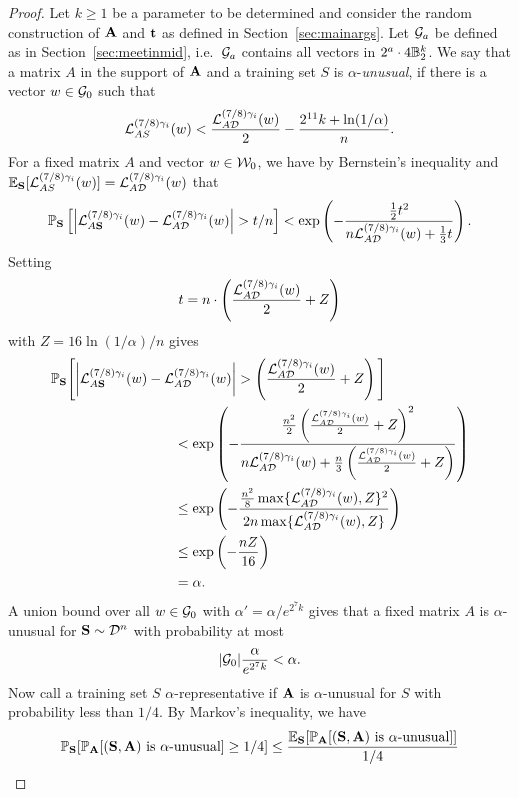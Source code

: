 \begin{proof}
Let $k \geq 1$ be a parameter to be determined and consider the random construction of $\mathbf{A}$ and $\mathbf{t}$ as defined in Section~\ref{sec:mainargs}. Let $\mathcal{G}_a$ be defined as in Section~\ref{sec:meetinmid}, i.e.\ $\mathcal{G}_a$ contains all vectors in $2^a \cdot 4 \mathbb{B}_2^k$. We say that a matrix $A$ in the support of $\mathbf{A}$ and a training set $S$ is $\alpha$-\emph{unusual}, if there is a vector $w \in \mathcal{G}_0$ such that
\[
\mathcal{L}_{A S}^{(7/8)\gamma_i}(w) < \frac{\mathcal{L}_{A \mathcal{D}}^{(7/8)\gamma_i}(w)}{2} - \frac{2^{11} k + \ln(1/\alpha)}{n}.
\]
For a fixed matrix $A$ and vector $w \in \mathcal{W}_0$, we have by Bernstein's inequality and $\mathbb{E}_{\mathbf{S}}[\mathcal{L}_{A S}^{(7/8)\gamma_i}(w)]= \mathcal{L}_{A \mathcal{D}}^{(7/8)\gamma_i}(w)$ that
\begin{align*}
    \Pr_{\rS}\left[\left|\Loss_{A \rS}^{(7/8)\gamma_i}(w) -\Loss_{A \cD}^{(7/8)\gamma_i}(w)\right|>t/n \right] < \exp\left(- \frac{\frac{1}{2} t^2}{n\Loss_{A \cD}^{(7/8)\gamma_i}(w) + \frac{1}{3}t}\right).
\end{align*}
Setting
\[
t = n \cdot \left( \frac{\mathcal{L}_{A \mathcal{D}}^{(7/8)\gamma_i}(w)}{2} + Z\right)
\]
with $Z=16 \ln(1/\alpha)/n$ gives
\begin{align*}
    \Pr_{\rS}\Bigg[\bigg|\Loss_{A \rS}^{(7/8)\gamma_i}(w) -\Loss&_{A \cD}^{(7/8)\gamma_i}(w)\bigg|>\left( \frac{\Loss_{A \cD}^{(7/8)\gamma_i}(w)}{2} + Z\right) \Bigg]\\ 
    &< \exp\left(- \frac{\frac{n^2}{2} \left( \frac{\Loss_{A \cD}^{(7/8)\gamma_i}(w)}{2} + Z\right)^2}{n\Loss_{A \cD}^{(7/8)\gamma_i}(w) + \frac{n}{3}\left( \frac{\Loss_{A \cD}^{(7/8)\gamma_i}(w)}{2} + Z\right)}\right) \\
    &\leq \exp\left(- \frac{\frac{n^2}{8} \max\{\Loss_{A \cD}^{(7/8)\gamma_i}(w), Z\}^2}{2n \max\{\Loss_{A \cD}^{(7/8)\gamma_i}(w), Z\}}\right) \\
    &\leq \exp\left(-\frac{n Z}{16} \right) \\
    &= \alpha.
\end{align*}
A union bound over all $w \in \mathcal{G}_0$ with $\alpha' = \alpha/e^{2^7 k}$ gives that a fixed matrix $A$ is $\alpha$-unusual for $\mathbf{S} \sim \mathcal{D}^n$ with probability at most
\[
|\mathcal{G}_0| \frac{\alpha}{e^{2^7 k}} < \alpha.
\]
Now call a training set $S$ $\alpha$-representative if $\mathbf{A}$ is $\alpha$-unusual for $S$ with probability less than $1/4$. By Markov's inequality, we have
\begin{align*}
\Pr_{\rS}[\Pr_{\rA}[(\rS,\rA) \textrm{ is $\alpha$-unusual}] \geq 1/4] &\leq \frac{\E_{\rS}[\Pr_{\rA}[(\rS,\rA) \textrm{ is $\alpha$-unusual}]]}{1/4} \\

\end{align*}
\end{proof}
